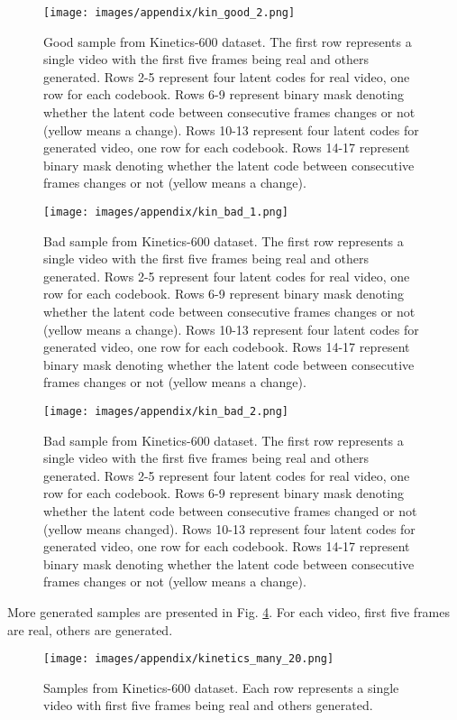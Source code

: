 \documentclass{article}
\begin{document}
\begin{figure}[!h]
\centering
\texttt{[image: images/appendix/kin\_good\_2.png]}
\caption{Good sample from Kinetics-600 dataset. The first row represents a single video with the first five frames being real and others generated. Rows 2-5 represent four latent codes for real video, one row for each codebook. Rows 6-9 represent binary mask denoting whether the latent code between consecutive frames changes or not (yellow means  a change). Rows 10-13 represent four latent codes for generated video, one row for each codebook. Rows 14-17 represent binary mask denoting whether the latent code between consecutive frames changes or not (yellow means a change).} 
\label{fig:kin_good_2}
\end{figure}


\begin{figure}[!h]
\centering
\texttt{[image: images/appendix/kin\_bad\_1.png]}
\caption{Bad sample from Kinetics-600 dataset. The first row represents a single video with the first five frames being real and others generated. Rows 2-5 represent four latent codes for real video, one row for each codebook. Rows 6-9 represent binary mask denoting whether the latent code between consecutive frames changes or not (yellow means a change). Rows 10-13 represent four latent codes for generated video, one row for each codebook. Rows 14-17 represent binary mask denoting whether the latent code between consecutive frames changes or not (yellow means a change). }
\label{fig:kin_bad_1}
\end{figure}

\begin{figure}[!h]
\centering
\texttt{[image: images/appendix/kin\_bad\_2.png]}
\caption{Bad sample from Kinetics-600 dataset. The first row represents a single video with the first five frames being real and others generated. Rows 2-5 represent four latent codes for real video, one row for each codebook. Rows 6-9 represent binary mask denoting whether the latent code between consecutive frames changed or not (yellow means changed). Rows 10-13 represent four latent codes for generated video, one row for each codebook. Rows 14-17 represent binary mask denoting whether the latent code between consecutive frames changes or not (yellow means a change).} 
\label{fig:kin_bad_2}
\end{figure}

More generated samples are presented in Fig. \ref{fig:kinetics_many_20}. For each video, first five frames are real, others are generated.

\begin{figure}[!h]
\centering
\texttt{[image: images/appendix/kinetics\_many\_20.png]}
\caption{Samples from Kinetics-600 dataset. Each row represents a single video with first five frames being real and others generated.} 
\label{fig:kinetics_many_20}
\end{figure} 
\end{document}

